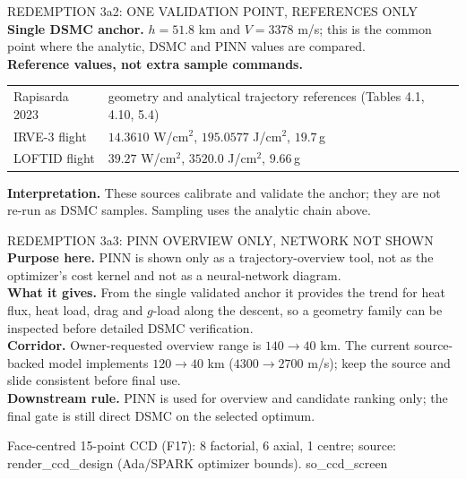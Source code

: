 \documentclass[aspectratio=169,11pt]{beamer}
\begin{document}
\begin{frame}{REDEMPTION 3a2: ONE VALIDATION POINT, REFERENCES ONLY}
  \small
  \textbf{Single DSMC anchor.} $h=51.8$ km and $V=3378$ m/s; this is the
  common point where the analytic, DSMC and PINN values are compared.\\
  \textbf{Reference values, not extra sample commands.}
  \begin{tabular}{@{}p{3.1cm}p{9.0cm}@{}}
  Rapisarda 2023 & geometry and analytical trajectory references (Tables 4.1, 4.10, 5.4)\\
  IRVE-3 flight & $14.3610$ W/cm$^2$, $195.0577$ J/cm$^2$, $19.7$\,g\\
  LOFTID flight & $39.27$ W/cm$^2$, $3520.0$ J/cm$^2$, $9.66$\,g\\
  \end{tabular}
  \vspace{0.2cm}
  \textbf{Interpretation.} These sources calibrate and validate the anchor; they
  are not re-run as DSMC samples. Sampling uses the analytic chain above.
\end{frame}

\begin{frame}{REDEMPTION 3a3: PINN OVERVIEW ONLY, NETWORK NOT SHOWN}
  \small
  \textbf{Purpose here.} PINN is shown only as a trajectory-overview tool, not
  as the optimizer's cost kernel and not as a neural-network diagram.\\
  \textbf{What it gives.} From the single validated anchor it provides the trend
  for heat flux, heat load, drag and $g$-load along the descent, so a geometry
  family can be inspected before detailed DSMC verification.\\
  \textbf{Corridor.} Owner-requested overview range is $140\rightarrow40$ km.
  The current source-backed model implements $120\rightarrow40$ km
  ($4300\rightarrow2700$ m/s); keep the source and slide consistent before final use.\\
  \textbf{Downstream rule.} PINN is used for overview and candidate ranking only;
  the final gate is still direct DSMC on the selected optimum.
\end{frame}

  {%
   Face-centred 15-point CCD (F17): 8 factorial, 6 axial, 1 centre;
   source: render\_ccd\_design (Ada/SPARK optimizer bounds).}
  {so_ccd_screen}
\end{document}
